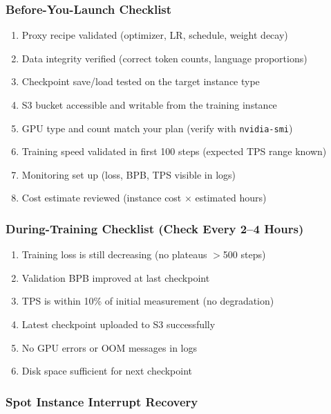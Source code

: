 \documentclass[11pt,a4paper]{article}
\begin{document}
\subsubsection{Before-You-Launch Checklist}

\begin{enumerate}[nosep]
  \item[$\square$] Proxy recipe validated (optimizer, LR, schedule, weight decay)
  \item[$\square$] Data integrity verified (correct token counts, language proportions)
  \item[$\square$] Checkpoint save/load tested on the target instance type
  \item[$\square$] S3 bucket accessible and writable from the training instance
  \item[$\square$] GPU type and count match your plan (verify with \texttt{nvidia-smi})
  \item[$\square$] Training speed validated in first 100 steps (expected TPS range known)
  \item[$\square$] Monitoring set up (loss, BPB, TPS visible in logs)
  \item[$\square$] Cost estimate reviewed (instance cost $\times$ estimated hours)
\end{enumerate}

\subsubsection{During-Training Checklist (Check Every 2--4 Hours)}

\begin{enumerate}[nosep]
  \item[$\square$] Training loss is still decreasing (no plateaus $>$500 steps)
  \item[$\square$] Validation BPB improved at last checkpoint
  \item[$\square$] TPS is within 10\% of initial measurement (no degradation)
  \item[$\square$] Latest checkpoint uploaded to S3 successfully
  \item[$\square$] No GPU errors or OOM messages in logs
  \item[$\square$] Disk space sufficient for next checkpoint
\end{enumerate}

\subsubsection{Spot Instance Interrupt Recovery}
\end{document}
